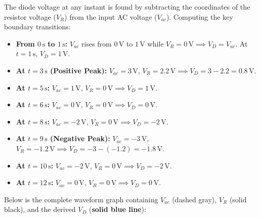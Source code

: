 \documentclass[12pt,a3paper]{article}
\begin{document}
\begin{enumerate}
\begin{tcolorbox}[enhanced,breakable,ansbox,colback=cA!4,colframe=cA,boxrule=0.8pt,arc=5pt,title={\textbf{Answer}},fonttitle=\bfseries\color{white},colbacktitle=cA]
The diode voltage at any instant is found by subtracting the coordinates of the resistor voltage ($V_R$) from the input AC voltage ($V_{ac}$). Computing the key boundary transitions:
\begin{itemize}
    \item \textbf{From $0\,\text{s}$ to $1\,\text{s}$:} $V_{ac}$ rises from $0\,\text{V}$ to $1\,\text{V}$ while $V_R = 0\,\text{V} \implies V_D = V_{ac}$. At $t = 1\,\text{s}$, $V_D = 1\,\text{V}$.
    \item \textbf{At $t = 3\,\text{s}$ (Positive Peak):} $V_{ac} = 3\,\text{V}$, $V_R = 2.2\,\text{V} \implies V_D = 3 - 2.2 = 0.8\,\text{V}$.
    \item \textbf{At $t = 5\,\text{s}$:} $V_{ac} = 1\,\text{V}$, $V_R = 0\,\text{V} \implies V_D = 1\,\text{V}$.
    \item \textbf{At $t = 6\,\text{s}$:} $V_{ac} = 0\,\text{V}$, $V_R = 0\,\text{V} \implies V_D = 0\,\text{V}$.
    \item \textbf{At $t = 8\,\text{s}$:} $V_{ac} = -2\,\text{V}$, $V_R = 0\,\text{V} \implies V_D = -2\,\text{V}$.
    \item \textbf{At $t = 9\,\text{s}$ (Negative Peak):} $V_{ac} = -3\,\text{V}$, $V_R = -1.2\,\text{V} \implies V_D = -3 - (-1.2) = -1.8\,\text{V}$.
    \item \textbf{At $t = 10\,\text{s}$:} $V_{ac} = -2\,\text{V}$, $V_R = 0\,\text{V} \implies V_D = -2\,\text{V}$.
    \item \textbf{At $t = 12\,\text{s}$:} $V_{ac} = 0\,\text{V}$, $V_R = 0\,\text{V} \implies V_D = 0\,\text{V}$.
\end{itemize}

Below is the complete waveform graph containing $V_{ac}$ (dashed gray), $V_R$ (solid black), and the derived $V_D$ (\textbf{solid blue line}):

\begin{center}
\end{center}
\end{tcolorbox}
\end{enumerate}
\end{document}
